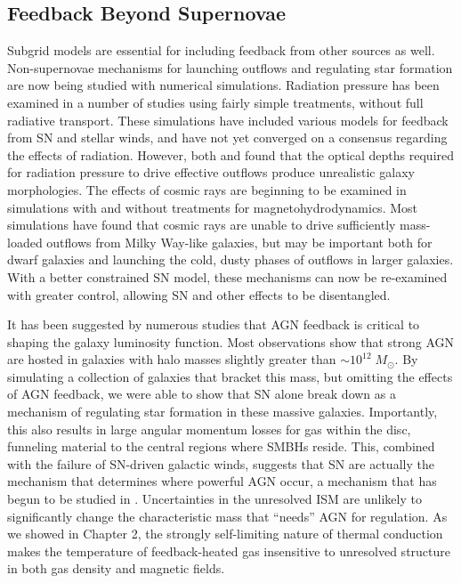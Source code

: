 \subsection{Feedback Beyond Supernovae}
Subgrid models are essential for including feedback from other sources as well.
Non-supernovae mechanisms for launching outflows and regulating star formation
are now being studied with numerical simulations.  Radiation pressure has been
examined in a number of studies \citep{Hopkins2014,Roskar2014,Agertz2015} using
fairly simple treatments, without full radiative transport.  These simulations
have included various models for feedback from SN and stellar winds, and have
not yet converged on a consensus regarding the effects of radiation.  However,
both \citet{Roskar2014} and \citet{Agertz2015} found that the optical depths
required for radiation pressure to drive effective outflows produce unrealistic
galaxy morphologies.  The effects of cosmic rays are beginning to be examined in
simulations with \citep{Girichidis2015} and without
\citep{Jubelgas2008,Booth2013} treatments for magnetohydrodynamics.  Most
simulations have found that cosmic rays are unable to drive sufficiently
mass-loaded outflows from Milky Way-like galaxies, but may be important both for
dwarf galaxies and launching the cold, dusty phases of outflows in larger
galaxies.  With a better constrained SN model, these mechanisms can now be
re-examined with greater control, allowing SN and other effects to be
disentangled.

It has been suggested by numerous studies \citep{Benson2003,Bower2006} that AGN
feedback is critical to shaping the galaxy luminosity function.  Most
observations \citep{Kauffmann2003b} show that strong AGN are hosted in galaxies
with halo masses slightly greater than $\sim10^{12}\;M_\odot$.  By simulating a
collection of galaxies that bracket this mass, but omitting the effects of AGN
feedback, we were able to show that SN alone break down as a mechanism of
regulating star formation in these massive galaxies.  Importantly, this also
results in large angular momentum losses for gas within the disc, funneling
material to the central regions where SMBHs reside.  This, combined with the
failure of SN-driven galactic winds, suggests that SN are actually the mechanism
that determines where powerful AGN occur, a mechanism that has begun to be studied in
\citet{Bower2016}.  Uncertainties in the unresolved ISM are unlikely to
significantly change the characteristic mass that ``needs'' AGN for regulation.
As we showed in Chapter 2, the strongly self-limiting nature of thermal
conduction makes the temperature of feedback-heated gas insensitive to unresolved
structure in both gas density and magnetic fields.

